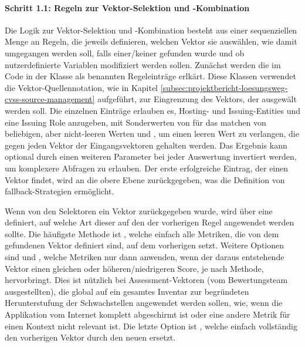 \paragraph{Schritt 1.1: Regeln zur Vektor-Selektion und -Kombination}

Die Logik zur Vektor-Selektion und -Kombination besteht aus einer sequenziellen Menge an Regeln, die jeweils definieren, welchen Vektor sie auswählen, wie damit umgegangen werden soll, falls einer/keiner gefunden wurde und ob nutzerdefinierte Variablen modifiziert werden sollen.
Zunächst werden die im Code in der Klasse  als  benannten Regeleinträge erlkärt.
Diese Klassen verwendet die Vektor-Quellennotation, wie in Kapitel \ref{subsec:projektbericht-loesungsweg-cvss-source-management} aufgeführt, zur Eingrenzung des Vektors, der ausgewält werden soll.
Die einzelnen Einträge erlauben es, Hosting- und Issuing-Entities und eine Issuing Role anzugeben, mit Sonderwerten von \qt{*} für das matchen von beliebigen, aber nicht-leeren Werten und , um einen leeren Wert zu verlangen, die gegen jeden Vektor der Eingangsvektoren gehalten werden.
Das Ergebnis kann optional durch einen weiteren Parameter bei jeder Auswertung invertiert werden, um komplexere Abfragen zu erlauben.
Der erste erfolgreiche Eintrag, der einen Vektor findet, wird an die obere Ebene zurückgegeben, was die Definition von fallback-Strategien ermöglicht.


Wenn von den Selektoren ein Vektor zurückgegeben wurde, wird über eine  definiert, auf welche Art dieser auf den der vorherigen Regel angewendet werden sollte.
Die häufigste Methode ist , welche einfach alle Metriken, die von dem gefundenen Vektor definiert sind, auf dem vorherigen setzt.
Weitere Optionen sind  und , welche Metriken nur dann anwenden, wenn der daraus entstehende Vektor einen gleichen oder höheren/niedrigeren Score, je nach Methode, hervorbringt.
Dies ist nützlich bei Assessment-Vektoren (vom Bewertungsteam ausgestellten), die global auf ein gesamtes Inventar zur begründeten Herunterstufung der Schwachstellen angewendet werden sollen, wie, wenn die Applikation vom Internet komplett abgeschirmt ist oder eine andere Metrik für einen Kontext nicht relevant ist.
Die letzte Option ist , welche einfach vollständig den vorherigen Vektor durch den neuen ersetzt.

